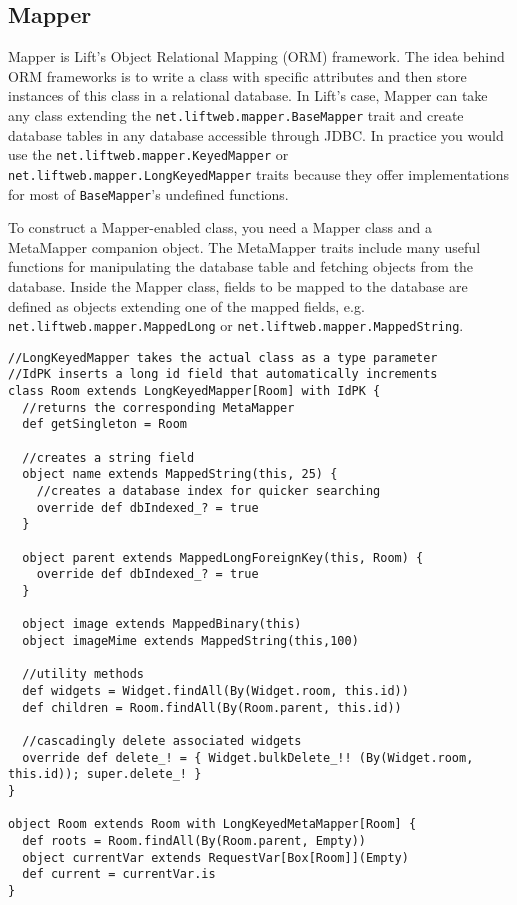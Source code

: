 \subsection{Mapper}

Mapper is Lift's Object Relational Mapping (ORM) framework. The idea behind ORM frameworks is to write a class with specific attributes and then store instances of this class in a relational database. In Lift's case, Mapper can take any class extending the \lstinline!net.liftweb.mapper.BaseMapper! trait and create database tables in any database accessible through JDBC. In practice you would use the \lstinline!net.liftweb.mapper.KeyedMapper! or \lstinline!net.liftweb.mapper.LongKeyedMapper! traits because they offer implementations for most of \lstinline!BaseMapper!'s undefined functions.

To construct a Mapper-enabled class, you need a Mapper class and a MetaMapper companion object. The MetaMapper traits include many useful functions for manipulating the database table and fetching objects from the database. Inside the Mapper class, fields to be mapped to the database are defined as objects extending one of the mapped fields, e.g. \lstinline!net.liftweb.mapper.MappedLong! or \lstinline!net.liftweb.mapper.MappedString!.

\begin{lstlisting}[caption=Lift Mapper: Room.scala,label=lst:lift:mapper]
//LongKeyedMapper takes the actual class as a type parameter
//IdPK inserts a long id field that automatically increments
class Room extends LongKeyedMapper[Room] with IdPK {
  //returns the corresponding MetaMapper
  def getSingleton = Room

  //creates a string field
  object name extends MappedString(this, 25) {
    //creates a database index for quicker searching
    override def dbIndexed_? = true
  }

  object parent extends MappedLongForeignKey(this, Room) {
    override def dbIndexed_? = true
  }

  object image extends MappedBinary(this)
  object imageMime extends MappedString(this,100)

  //utility methods
  def widgets = Widget.findAll(By(Widget.room, this.id))
  def children = Room.findAll(By(Room.parent, this.id))

  //cascadingly delete associated widgets
  override def delete_! = { Widget.bulkDelete_!! (By(Widget.room, this.id)); super.delete_! }
}

object Room extends Room with LongKeyedMetaMapper[Room] {
  def roots = Room.findAll(By(Room.parent, Empty))
  object currentVar extends RequestVar[Box[Room]](Empty)
  def current = currentVar.is
}
\end{lstlisting}


